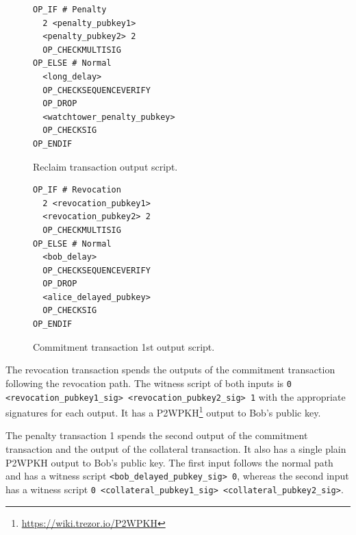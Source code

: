 \documentclass[twocolumn,showpacs,%
  nofootinbib,aps,superscriptaddress,%
  eqsecnum,prd,notitlepage,showkeys,10pt]{revtex4-1}
\begin{document}
\begin{figure}
\footnotesize
\begin{minipage}[ht]{0.45\textwidth}
 \begin{verbatim}OP_IF # Penalty
  2 <penalty_pubkey1>
  <penalty_pubkey2> 2
  OP_CHECKMULTISIG
OP_ELSE # Normal
  <long_delay>
  OP_CHECKSEQUENCEVERIFY
  OP_DROP
  <watchtower_penalty_pubkey>
  OP_CHECKSIG
OP_ENDIF\end{verbatim}
\caption{\footnotesize Reclaim transaction output script.}
\label{script:claim}
\end{minipage}
\hfill
\begin{minipage}[ht]{0.45\textwidth}
	\begin{verbatim}OP_IF # Revocation
  2 <revocation_pubkey1>
  <revocation_pubkey2> 2
  OP_CHECKMULTISIG
OP_ELSE # Normal
  <bob_delay>
  OP_CHECKSEQUENCEVERIFY
  OP_DROP
  <alice_delayed_pubkey>
  OP_CHECKSIG
OP_ENDIF\end{verbatim}
\caption{\footnotesize Commitment transaction 1st output script.}
\label{script:commitment:first}
\end{minipage}
\end{figure}

The revocation transaction spends the outputs of the commitment transaction following the revocation path. The witness script of both inputs is \texttt{0 <revocation\_pubkey1\_sig> <revocation\_pubkey2\_sig> 1} with the appropriate signatures for each output. It has a P2WPKH\footnote{\url{https://wiki.trezor.io/P2WPKH}} output to Bob's public key.

The penalty transaction 1 spends the second output of the commitment transaction and the output of the collateral transaction. It also has a single plain P2WPKH output to Bob's public key. The first input follows the normal path and has a witness script \texttt{<bob\_delayed\_pubkey\_sig> 0}, whereas the second input has a witness script \texttt{0 <collateral\_pubkey1\_sig> <collateral\_pubkey2\_sig>}.
\end{document}
